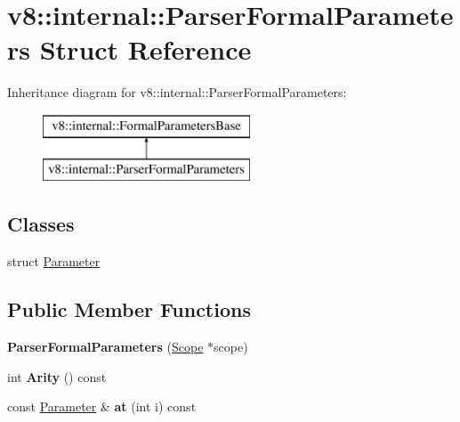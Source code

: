 \hypertarget{structv8_1_1internal_1_1_parser_formal_parameters}{}\section{v8\+:\+:internal\+:\+:Parser\+Formal\+Parameters Struct Reference}
\label{structv8_1_1internal_1_1_parser_formal_parameters}
Inheritance diagram for v8\+:\+:internal\+:\+:Parser\+Formal\+Parameters\+:\begin{figure}[H]
\begin{center}
\leavevmode
\includegraphics[height=2.000000cm]{structv8_1_1internal_1_1_parser_formal_parameters}
\end{center}
\end{figure}
\subsection*{Classes}
\begin{DoxyCompactItemize}
\item 
struct \hyperlink{structv8_1_1internal_1_1_parser_formal_parameters_1_1_parameter}{Parameter}
\end{DoxyCompactItemize}
\subsection*{Public Member Functions}
\begin{DoxyCompactItemize}
\item 
{\bfseries Parser\+Formal\+Parameters} (\hyperlink{classv8_1_1internal_1_1_scope}{Scope} $\ast$scope)\hypertarget{structv8_1_1internal_1_1_parser_formal_parameters_a8ad0af37210f84c5156424765ba0aa12}{}\label{structv8_1_1internal_1_1_parser_formal_parameters_a8ad0af37210f84c5156424765ba0aa12}

\item 
int {\bfseries Arity} () const \hypertarget{structv8_1_1internal_1_1_parser_formal_parameters_a9609d1e0325d5c8493de75a2097326ff}{}\label{structv8_1_1internal_1_1_parser_formal_parameters_a9609d1e0325d5c8493de75a2097326ff}

\item 
const \hyperlink{structv8_1_1internal_1_1_parser_formal_parameters_1_1_parameter}{Parameter} \& {\bfseries at} (int i) const \hypertarget{structv8_1_1internal_1_1_parser_formal_parameters_ac04b21036895f3e0e7ad9ec8dd1eaed1}{}\label{structv8_1_1internal_1_1_parser_formal_parameters_ac04b21036895f3e0e7ad9ec8dd1eaed1}

\end{DoxyCompactItemize}
